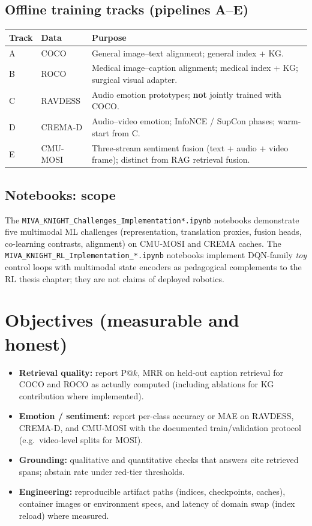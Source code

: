 \documentclass[12pt,a4paper]{article}
\begin{document}
\subsection{Offline training tracks (pipelines A--E)}
\begin{center}
\small
\begin{tabular}{@{}llp{6.5cm}@{}}
\toprule
\textbf{Track} & \textbf{Data} & \textbf{Purpose} \\
\midrule
A & COCO & General image--text alignment; general index + KG. \\
B & ROCO & Medical image--caption alignment; medical index + KG; surgical visual adapter. \\
C & RAVDESS & Audio emotion prototypes; \textbf{not} jointly trained with COCO. \\
D & CREMA-D & Audio--video emotion; InfoNCE / SupCon phases; warm-start from C. \\
E & CMU-MOSI & Three-stream sentiment fusion (text + audio + video frame); distinct from RAG retrieval fusion. \\
\bottomrule
\end{tabular}
\end{center}

\subsection{Notebooks: scope}
The \texttt{MIVA\_KNIGHT\_Challenges\_Implementation*.ipynb} notebooks demonstrate five
multimodal ML challenges (representation, translation proxies, fusion heads, co-learning
contrasts, alignment) on CMU-MOSI and CREMA caches. The
\texttt{MIVA\_KNIGHT\_RL\_Implementation\_*.ipynb} notebooks implement DQN-family
\emph{toy} control loops with multimodal state encoders as pedagogical complements to
the RL thesis chapter; they are not claims of deployed robotics.

\section{Objectives (measurable and honest)}

\begin{itemize}[nosep]
  \item \textbf{Retrieval quality:} report $\mathrm{P@}k$, MRR on held-out caption
        retrieval for COCO and ROCO as actually computed (including ablations for KG
        contribution where implemented).
  \item \textbf{Emotion / sentiment:} report per-class accuracy or MAE on RAVDESS,
        CREMA-D, and CMU-MOSI with the documented train/validation protocol (e.g.\
        video-level splits for MOSI).
  \item \textbf{Grounding:} qualitative and quantitative checks that answers cite
        retrieved spans; abstain rate under red-tier thresholds.
  \item \textbf{Engineering:} reproducible artifact paths (indices, checkpoints,
        caches), container images or environment specs, and latency of domain swap
        (index reload) where measured.
\end{itemize}
\end{document}
